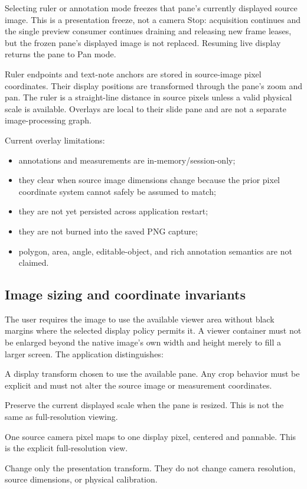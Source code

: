 \documentclass[11pt,a4paper,oneside]{article}
\begin{document}
Selecting ruler or annotation mode freezes that pane's currently displayed source image. This is a presentation freeze, not a camera Stop: acquisition continues and the single preview consumer continues draining and releasing new frame leases, but the frozen pane's displayed image is not replaced. Resuming live display returns the pane to Pan mode.

Ruler endpoints and text-note anchors are stored in source-image pixel coordinates. Their display positions are transformed through the pane's zoom and pan. The ruler is a straight-line distance in source pixels unless a valid physical scale is available. Overlays are local to their slide pane and are not a separate image-processing graph.

Current overlay limitations:
\begin{itemize}
  \item annotations and measurements are in-memory/session-only;
  \item they clear when source image dimensions change because the prior pixel coordinate system cannot safely be assumed to match;
  \item they are not yet persisted across application restart;
  \item they are not burned into the saved PNG capture;
  \item polygon, area, angle, editable-object, and rich annotation semantics are not claimed.
\end{itemize}

\subsection{Image sizing and coordinate invariants}
The user requires the image to use the available viewer area without black margins where the selected display policy permits it. A viewer container must not be enlarged beyond the native image's own width and height merely to fill a larger screen. The application distinguishes:
\begin{description}[style=nextline]
  \item[Fit / fill presentation] A display transform chosen to use the available pane. Any crop behavior must be explicit and must not alter the source image or measurement coordinates.
  \item[Lock size] Preserve the current displayed scale when the pane is resized. This is not the same as full-resolution viewing.
  \item[1:1] One source camera pixel maps to one display pixel, centered and pannable. This is the explicit full-resolution view.
  \item[Zoom and pan] Change only the presentation transform. They do not change camera resolution, source dimensions, or physical calibration.
\end{description}
\end{document}
